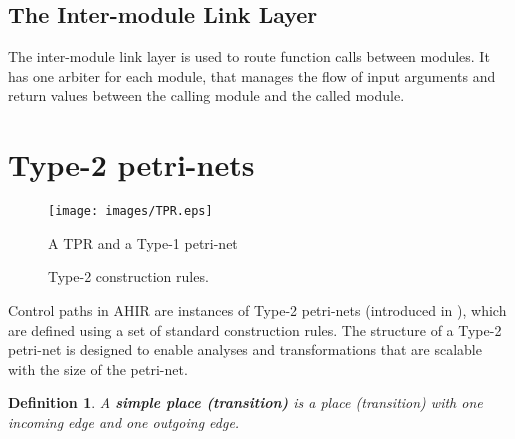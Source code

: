 \documentclass[conference]{IEEEtran}
\newtheorem{definition}{Definition}[section]
\begin{document}
\subsection{The Inter-module Link Layer}

The inter-module link layer is used to route function calls between
modules. It has one arbiter for each module, that manages the flow of
input arguments and return values between the calling module and the
called module. 

\section{Type-2 petri-nets}
\label{section:type-2}

\begin{figure}[!t]
  \centering
  \texttt{[image: images/TPR.eps]}
  \caption{A TPR and a Type-1 petri-net}
  \label{figure:TPR}
\end{figure}

\begin{figure}[!t]
  \centering
  \hspace{0.125in}
  \caption{Type-2 construction rules.}
  \label{figure:Type-2-TPRs}
\end{figure}

Control paths in AHIR are instances of Type-2 petri-nets (introduced
in \cite{ahir_thesis}), which
are defined using a set of standard construction rules. 
The structure of a Type-2 petri-net is
designed to enable analyses and transformations that are scalable with
the size of the petri-net.

\begin{definition} A {\bf simple place (transition)} is a place
(transition) with one incoming edge and one outgoing edge.
\end{definition}
\end{document}
